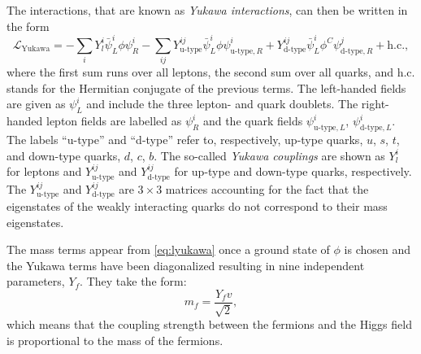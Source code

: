 The interactions, that are known as \emph{Yukawa interactions}, can then be written in the form
\begin{equation}
  \mathcal{L}_\text{Yukawa} = - \sum_{i} Y_l^i \bar{\psi}^{i}_{L} \phi \psi^{i}_{R} - \sum_{ij} Y_{\text{u-type}}^{ij} \bar{\psi}^{i}_{L} \phi \psi^{i}_{\text{u-type},R} + Y_{\text{d-type}}^{ij} \bar{\psi}^{i}_{L} \phi^C \psi^{j}_{\text{d-type}, R} + \text{h.c.}, 
  \label{eq:lyukawa}
\end{equation}
where the first sum runs over all leptons, the second sum over all quarks, and h.c. stands for the Hermitian conjugate of the previous terms.
The left-handed fields are given as $\psi^{i}_{L}$ and include the three lepton- and quark doublets. 
The right-handed lepton fields are labelled as $\psi_R^i$ and the quark fields $\psi^{i}_{\text{u-type},L}$, $\psi^{i}_{\text{d-type},L}$.
The labels ``u-type'' and ``d-type'' refer to, respectively, up-type quarks, $u$, $s$, $t$, and down-type quarks, $d$, $c$, $b$. 
The so-called \emph{Yukawa couplings} are shown as $Y_l^i$ for leptons and $Y_{\text{u-type}}^{ij}$ and $Y_{\text{d-type}}^{ij}$ for up-type and down-type quarks, respectively. The $Y_{\text{u-type}}^{ij}$ and $Y_{\text{d-type}}^{ij}$ are $3 \times 3$ matrices accounting for the fact that the eigenstates of the weakly interacting quarks do not correspond to their mass eigenstates. 


The mass terms appear from \cref{eq:lyukawa} once a ground state of $\phi$ is chosen and the Yukawa terms have been diagonalized resulting in nine independent parameters, $Y_f$. 
They take the form:
\begin{equation}
  m_f = \frac{Y_f v}{\sqrt{2}},
\end{equation}
which means that the coupling strength between the fermions and the Higgs field is proportional to the mass of the fermions.

